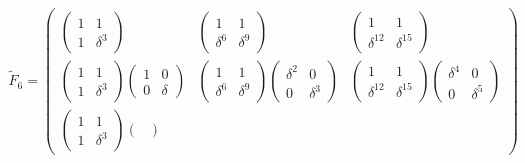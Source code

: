 \begin{multline*}
    \widetilde{F}_6
    =
    \begin{pmatrix}
        \begin{pmatrix}
            1 & 1        \\
            1 & \delta^3
        \end{pmatrix}
         &
        \begin{pmatrix}
            1        & 1        \\
            \delta^6 & \delta^9
        \end{pmatrix}
         &
        \begin{pmatrix}
            1           & 1           \\
            \delta^{12} & \delta^{15}
        \end{pmatrix}
        \\
        \begin{pmatrix}
            1 & 1        \\
            1 & \delta^3
        \end{pmatrix}
        \begin{pmatrix}
            1 & 0      \\
            0 & \delta
        \end{pmatrix}
         &
        \begin{pmatrix}
            1        & 1        \\
            \delta^6 & \delta^9
        \end{pmatrix}
        \begin{pmatrix}
            \delta^2 & 0        \\
            0        & \delta^3
        \end{pmatrix}
         &
        \begin{pmatrix}
            1           & 1           \\
            \delta^{12} & \delta^{15}
        \end{pmatrix}
        \begin{pmatrix}
            \delta^4 & 0        \\
            0        & \delta^5
        \end{pmatrix}
        \\
        \begin{pmatrix}
            1 & 1        \\
            1 & \delta^3
        \end{pmatrix}
        \begin{pmatrix}

\end{pmatrix}
\end{pmatrix}
\end{multline*}
